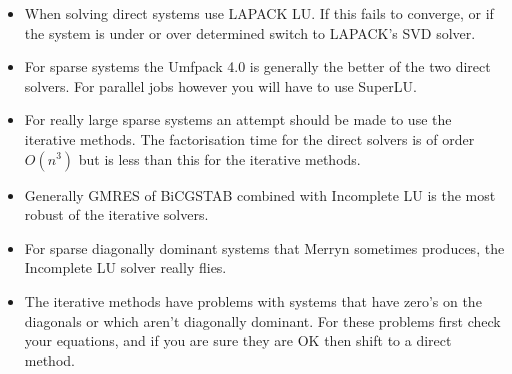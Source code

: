 \begin{itemize}
\item When solving direct systems use LAPACK LU. If this fails to converge, 
      or if the system is under or over determined switch to LAPACK's SVD
      solver.
\item For sparse systems the Umfpack 4.0 is generally the better of the two 
      direct solvers. For parallel jobs however you will have to use SuperLU.
\item For really large sparse systems an attempt should be made to use the
      iterative methods. The factorisation time for the direct solvers is
      of order $O(n^3)$ but is less than this for the iterative methods.
\item Generally GMRES of BiCGSTAB combined with Incomplete LU is the most
      robust of the iterative solvers.
\item For sparse diagonally dominant systems that Merryn sometimes produces, 
      the Incomplete LU solver really flies.
\item The iterative methods have problems with systems that have zero's on 
      the diagonals or which aren't diagonally dominant. For these problems 
      first check your equations, and if you are sure they are OK then shift 
      to a direct method.
\end{itemize}